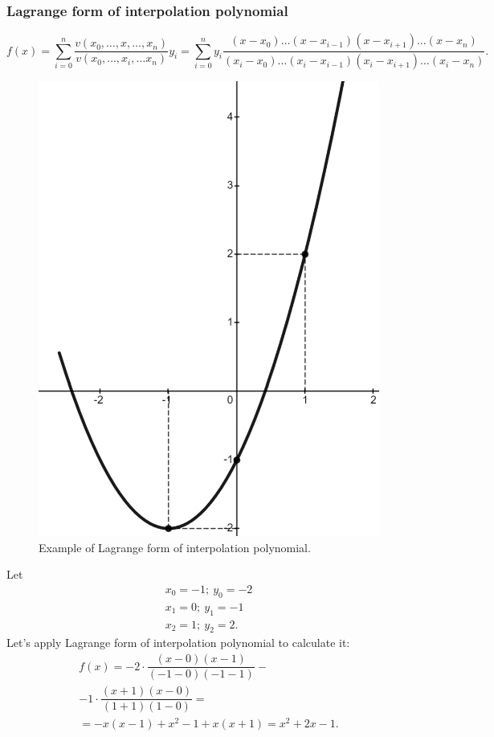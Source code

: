 \subsubsection*{Lagrange form of interpolation polynomial}
\[
    f(x) = \sum\limits_{i=0}^{n} \dfrac{v(x_0, \ldots, x, \ldots, x_n)}{v(x_0, \ldots, x_i, \ldots x_n)} y_i = \sum\limits_{i=0}^{n}y_i \dfrac{(x-x_0)\ldots(x-x_{i-1})(x-x_{i+1})\ldots (x-x_n)}{(x_i - x_0)\ldots (x_i - x_{i-1})(x_i - x_{i+1})\ldots (x_i - x_n)}.  
\]
\begin{figure}
    \includegraphics[height=0.4\columnwidth, width=0.37\columnwidth]{./lectures/images/lecture3_lagrange_example.png}
    \caption*{\scriptsize{Example of Lagrange form of interpolation polynomial.}}
\end{figure}
\vspace*{1cm}

\Ex Let 
\[
    \begin{array}{c}
        x_0 = -1; \ y_0 = -2 \\
        x_1 = 0; \ y_1 = -1\\
        x_2 = 1; \ y_2 = 2.
    \end{array} 
\]
Let's apply Lagrange form of interpolation polynomial to calculate it:
\[
    \begin{array}{c}
        f(x) = -2 \cdot \dfrac{(x-0)(x-1)}{(-1 - 0)(-1 -1)} - \\[0.4cm] - 1\cdot \dfrac{(x+1)(x-0)}{(1+1)(1-0)} = \\
         = -x(x-1) + x^2 - 1 + x(x+1) = x^2 + 2x - 1.
    \end{array}  
\]
\vspace*{0.25cm}

